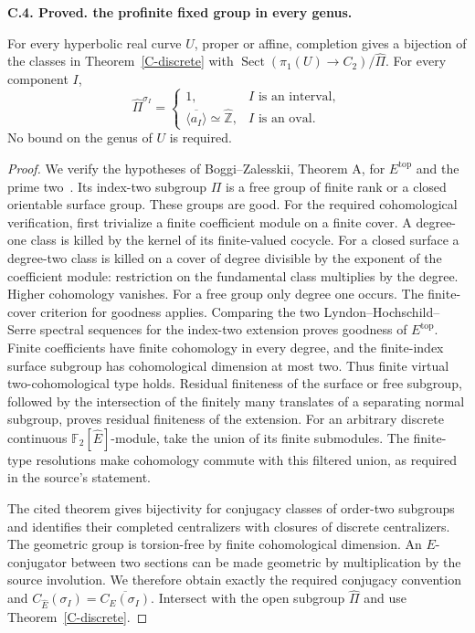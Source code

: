 \documentclass[11pt,oneside]{article}
\makeatletter
\newcounter{statementanchor}
\newenvironment{statement}[3]{%
 \refstepcounter{statementanchor}\def\@currentlabel{#1}%
 \par\addvspace{9pt}\noindent
 \textbf{#1. #2. #3.}\par\nobreak\noindent\ignorespaces
}{\par\addvspace{5pt}}
\makeatother
\begin{document}
\begin{statement}{C.4}{Proved}{the profinite fixed group in every genus}
\label{st:C.4}
\label{C-profinite-centralizer}
For every hyperbolic real curve $U$, proper or affine,
completion gives a bijection of the classes in
Theorem~\ref{C-discrete} with
$\operatorname{Sect}(\pi_1(U)\to C_2)/\widehat\Pi$.
For every component $I$,
\[
 \widehat\Pi^{\sigma_I}=
 \begin{cases}
  1,&I\text{ is an interval},\\
  \overline{\langle a_I\rangle}\simeq\widehat{\mathbb Z},
       &I\text{ is an oval}.
 \end{cases}
\]
No bound on the genus of $U$ is required.
\end{statement}
\begin{proof}
We verify the hypotheses of Boggi--Zalesskii, Theorem A,
for $E^{\mathrm{top}}$ and the prime two~\cite{BoggiZalesskii2024}.
Its index-two subgroup $\Pi$ is a free group of finite rank
or a closed orientable surface group. These groups are good.
For the required cohomological verification, first trivialize
a finite coefficient module on a finite cover. A degree-one
class is killed by the kernel of its finite-valued cocycle.
For a closed surface a degree-two class is killed on a cover
of degree divisible by the exponent of the coefficient
module: restriction on the fundamental class multiplies
by the degree. Higher cohomology vanishes. For a free
group only degree one occurs. The finite-cover criterion
for goodness applies. Comparing the two
Lyndon--Hochschild--Serre spectral sequences for the
index-two extension proves goodness of $E^{\mathrm{top}}$.
Finite coefficients have finite cohomology in every degree,
and the finite-index surface subgroup has cohomological
dimension at most two. Thus finite virtual
two-cohomological type holds.
Residual finiteness of the surface or free subgroup,
followed by the intersection of the finitely many
translates of a separating normal subgroup, proves
residual finiteness of the extension. For an arbitrary
discrete continuous $\mathbb F_2[\widehat E]$-module,
take the union of its finite submodules. The finite-type
resolutions make cohomology commute with this filtered
union, as required in the source's statement.

The cited theorem gives bijectivity for conjugacy classes
of order-two subgroups and identifies their completed
centralizers with closures of discrete centralizers.
The geometric group is torsion-free by finite
cohomological dimension. An $E$-conjugator between
two sections can be made geometric by multiplication
by the source involution. We therefore obtain exactly
the required conjugacy convention and
$C_{\widehat E}(\sigma_I)=\overline{C_E(\sigma_I)}$.
Intersect with the open subgroup $\widehat\Pi$ and use
Theorem~\ref{C-discrete}.


\end{proof}
\end{document}
